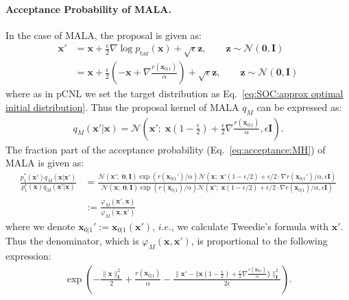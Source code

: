 \paragraph{Acceptance Probability of MALA.}
In the case of MALA, the proposal is given as:
\begin{align}
    \mathbf{x}'&=\mathbf{x}+\frac{\epsilon}{2}\nabla \log p_{\text{tar}}(\mathbf{x})+\sqrt{\epsilon}\mathbf{z},\qquad \mathbf{z}\sim \mathcal{N}(\mathbf{0}, \mathbf{I})\\
    &=\mathbf{x}+\frac{\epsilon}{2}\left(-\mathbf{x}+\nabla\frac{r(\mathbf{x}_{0|1})}{\alpha} \right)+\sqrt{\epsilon}\mathbf{z},\qquad \mathbf{z}\sim \mathcal{N}(\mathbf{0}, \mathbf{I})
\end{align}
where as in pCNL we set the target distribution as Eq.~\ref{eq:SOC:approx optimal initial distribution}. Thus the proposal kernel of MALA $q_M$ can be expressed as:
\begin{align}
    q_M(\mathbf{x}'|\mathbf{x})=\mathcal{N}\left(\mathbf{x}';\; \mathbf{x}\left(1-\frac{\epsilon}{2} \right)+\frac{\epsilon}{2}\nabla\frac{r(\mathbf{x}_{0|1})}{\alpha}, \epsilon\mathbf{I}\right).
\end{align}
The fraction part of the acceptance probability (Eq.~\ref{eq:acceptance:MH}) of MALA is given as:
\begin{align}
    \frac{p_1^*(\mathbf{x}')q_M(\mathbf{x}|\mathbf{x}')}{p_1^*(\mathbf{x})q_M(\mathbf{x}'|\mathbf{x})}&=\frac{\mathcal{N}(\mathbf{x}';\;\mathbf{0}, \mathbf{I})\exp (r(\mathbf{x}_{0|1}')/\alpha)\mathcal{N}(\mathbf{x};\;\mathbf{x}'(1-\epsilon/2)+\epsilon/2\cdot \nabla r(\mathbf{x}_{0|1}')/\alpha, \epsilon\mathbf{I})}{\mathcal{N}(\mathbf{x};\;\mathbf{0}, \mathbf{I})\exp (r(\mathbf{x}_{0|1})/\alpha)\mathcal{N}(\mathbf{x}';\;\mathbf{x}(1-\epsilon/2)+\epsilon/2\cdot \nabla r(\mathbf{x}_{0|1})/\alpha, \epsilon\mathbf{I})}\\
    &:=\frac{\varphi_M(\mathbf{x}',\mathbf{x})}{\varphi_M(\mathbf{x},\mathbf{x}')}
\end{align}
where we denote $\mathbf{x}_{0|1}':=\mathbf{x}_{0|1}(\mathbf{x}')$, $i.e.$, we calculate Tweedie's formula with $\mathbf{x}'$.
Thus the denominator, which is $\varphi_M(\mathbf{x},\mathbf{x}')$, is proportional to the following expression:
\begin{align}
    \exp \left( -\frac{\|\mathbf{x}\|^2_{\mathbf{I}}}{2}+\frac{r(\mathbf{x}_{0|1})}{\alpha}-\frac{\|\mathbf{x}'-\{ \mathbf{x}\left(1-\frac{\epsilon}{2} \right)+\frac{\epsilon}{2}\nabla\frac{r(\mathbf{x}_{0|1})}{\alpha} \} \|^2_{\mathbf{I}}}{2\epsilon} \right).
\end{align}
